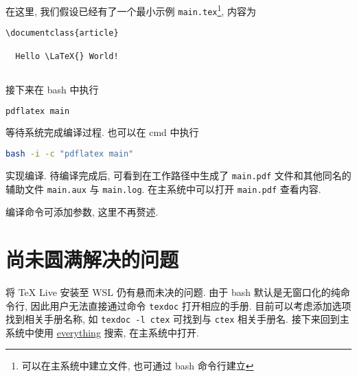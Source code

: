 在这里, 我们假设已经有了一个最小示例 \texttt{main.tex}\footnote{可以在主系统中建立文件, 也可通过 \textsf{bash} 命令行建立},
内容为
\begin{lstlisting}[language = {[LaTeX]TeX}]
  \documentclass{article}
  
  Hello \LaTeX{} World!
  
\end{lstlisting}
接下来在 \textsf{bash} 中执行
\begin{lstlisting}[language=bash]
  pdflatex main
\end{lstlisting}
等待系统完成编译过程. 
也可以在 \textsf{cmd} 中执行
\begin{lstlisting}[language=bash]
  bash -i -c "pdflatex main"
\end{lstlisting}
实现编译.
待编译完成后, 可看到在工作路径中生成了 \texttt{main.pdf} 文件和其他同名的辅助文件 \texttt{main.aux} 与 \texttt{main.log}.
在主系统中可以打开 \texttt{main.pdf} 查看内容.

编译命令可添加参数, 这里不再赘述.

\section{尚未圆满解决的问题}

将 \TeX{} Live 安装至 WSL 仍有悬而未决的问题.
由于 \textsf{bash} 默认是无窗口化的纯命令行,
因此用户无法直接通过命令 \texttt{texdoc} 打开相应的手册.
目前可以考虑添加选项找到相关手册名称,
如 \texttt{texdoc -l ctex} 可找到与 \texttt{ctex} 相关手册名.
接下来回到主系统中使用 \href{https://www.voidtools.com/zh-cn/}{everything} 搜索,
在主系统中打开.
